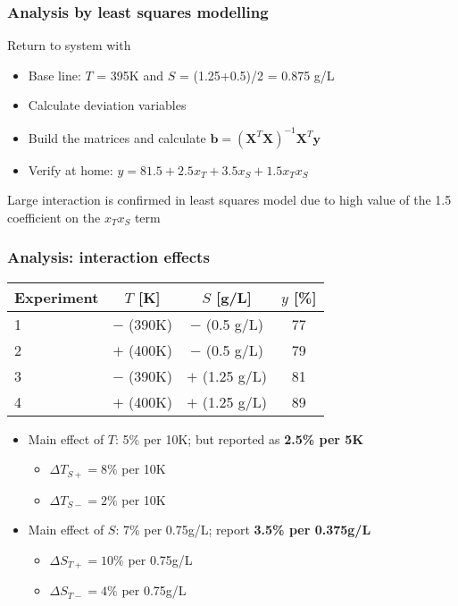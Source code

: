 \begin{frame}\frametitle{Analysis by least squares modelling}

	Return to system with {}
	\begin{itemize}
		\item	Base line: $T$ = 395K and $S$ = (1.25+0.5)/2 = 0.875 g/L
		\item	Calculate deviation variables
		\item	Build the matrices and calculate $\mathbf{b} = (\mathbf{X}^T\mathbf{X})^{-1}\mathbf{X}^T\mathbf{y}$
		\item	Verify at home: $y = 81.5 + 2.5 x_T + 3.5 x_S + 1.5 x_T x_S$
	\end{itemize}
	
	\vspace{12pt}
	Large interaction is confirmed in least squares model due to high value of the 1.5 coefficient on the $x_T x_S$ term
\end{frame}

\begin{frame}\frametitle{Analysis: interaction effects}

	\begin{center}
		\begin{tabulary}
			{\linewidth}{|l|c|c||c|} \hline \textbf{ Experiment } & \textbf{$T$ [K]} & \textbf{$S$ [g/L]} & \textbf{$y$ [\%]}\\ & $-$ (390K) & $-$ (0.5 g/L) & 77 \\ & $+$ (400K) & $-$ (0.5 g/L) & 79 \\ & $-$ (390K) & $+$ (1.25 g/L) & 81 \\ & $+$ (400K) & $+$ (1.25 g/L) & 89 \\\hline 
		\end{tabulary}
	\end{center}
	
	\vspace{12pt}
	\begin{itemize}
		\item	Main effect of $T$: 5\% per 10K; but reported as \textbf{2.5\% per 5K}
		\begin{itemize}
			\item	$\Delta T_{S+} = 8\%$ per 10K
			\item	$\Delta T_{S-} = 2\%$ per 10K
		\end{itemize}
		\item	Main effect of $S$: 7\% per 0.75g/L; {\small report }\textbf{3.5\% per 0.375g/L}
		\begin{itemize}
			\item	$\Delta S_{T+} = 10\%$ per 0.75g/L
			\item	$\Delta S_{T-} = 4\%$ per 0.75g/L
		\end{itemize}
	\end{itemize}
\end{frame}

